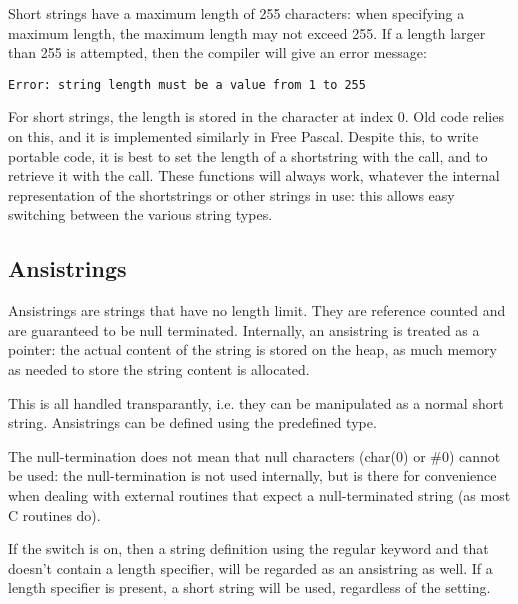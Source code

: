 \begin{remark}
Short strings have a maximum length of 255 characters: when specifying a
maximum length, the maximum length may not exceed 255. If a length larger
than 255 is attempted, then the compiler will give an error message:
\begin{verbatim}
Error: string length must be a value from 1 to 255
\end{verbatim}

For short strings, the length is stored in the character at index 0. Old
\tp code relies on this, and it is implemented similarly in Free
Pascal. 
Despite this, to write portable code, it is best to set the length of a 
shortstring  with the  call, and to retrieve
it with the  call.  These functions will always work, whatever
the internal representation of the shortstrings or other strings in use:
this allows easy switching between the various string types.
\end{remark}

\subsection{Ansistrings}
Ansistrings are strings that have no length limit. They are reference
counted and are guaranteed to be null terminated. Internally, an ansistring is treated as 
a pointer: the actual content of the string is stored on the heap, as much
memory as needed to store the string content is allocated. 

This is all handled transparantly, i.e. they can be manipulated as a normal 
short string. Ansistrings can be defined using the predefined  
type. 

\begin{remark} 
The null-termination does not mean that null characters (char(0) or \#0) 
cannot be used: the null-termination is not used internally, but is there for
convenience when dealing with external routines that expect a
null-terminated string (as most C routines do).
\end{remark}

If the  switch is on, then a string definition using the
regular  keyword and that doesn't contain a length specifier, 
will be regarded as an ansistring as well. If a length specifier is present,
a short string will be used, regardless of the  setting.

